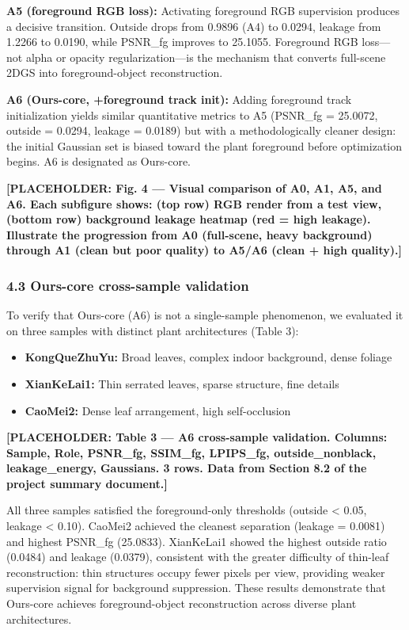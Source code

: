 \documentclass[11pt,a4paper]{article}
\begin{document}
\textbf{A5 (foreground RGB loss):} Activating foreground RGB supervision
produces a decisive transition. Outside drops from 0.9896 (A4) to
0.0294, leakage from 1.2266 to 0.0190, while PSNR\_fg improves to
25.1055. Foreground RGB loss---not alpha or opacity regularization---is
the mechanism that converts full-scene 2DGS into foreground-object
reconstruction.

\textbf{A6 (Ours-core, +foreground track init):} Adding foreground track
initialization yields similar quantitative metrics to A5 (PSNR\_fg =
25.0072, outside = 0.0294, leakage = 0.0189) but with a methodologically
cleaner design: the initial Gaussian set is biased toward the plant
foreground before optimization begins. A6 is designated as Ours-core.

\textbf{{[}PLACEHOLDER: Fig. 4 --- Visual comparison of A0, A1, A5, and
A6. Each subfigure shows: (top row) RGB render from a test view, (bottom
row) background leakage heatmap (red = high leakage). Illustrate the
progression from A0 (full-scene, heavy background) through A1 (clean but
poor quality) to A5/A6 (clean + high quality).{]}}

\subsubsection{4.3 Ours-core cross-sample
validation}\label{ours-core-cross-sample-validation}

To verify that Ours-core (A6) is not a single-sample phenomenon, we
evaluated it on three samples with distinct plant architectures (Table
3):

\begin{itemize}
\tightlist
\item
  \textbf{KongQueZhuYu:} Broad leaves, complex indoor background, dense
  foliage
\item
  \textbf{XianKeLai1:} Thin serrated leaves, sparse structure, fine
  details
\item
  \textbf{CaoMei2:} Dense leaf arrangement, high self-occlusion
\end{itemize}

\textbf{{[}PLACEHOLDER: Table 3 --- A6 cross-sample validation. Columns:
Sample, Role, PSNR\_fg, SSIM\_fg, LPIPS\_fg, outside\_nonblack,
leakage\_energy, Gaussians. 3 rows. Data from Section 8.2 of the project
summary document.{]}}

All three samples satisfied the foreground-only thresholds (outside
\textless{} 0.05, leakage \textless{} 0.10). CaoMei2 achieved the
cleanest separation (leakage = 0.0081) and highest PSNR\_fg (25.0833).
XianKeLai1 showed the highest outside ratio (0.0484) and leakage
(0.0379), consistent with the greater difficulty of thin-leaf
reconstruction: thin structures occupy fewer pixels per view, providing
weaker supervision signal for background suppression. These results
demonstrate that Ours-core achieves foreground-object reconstruction
across diverse plant architectures.
\end{document}
